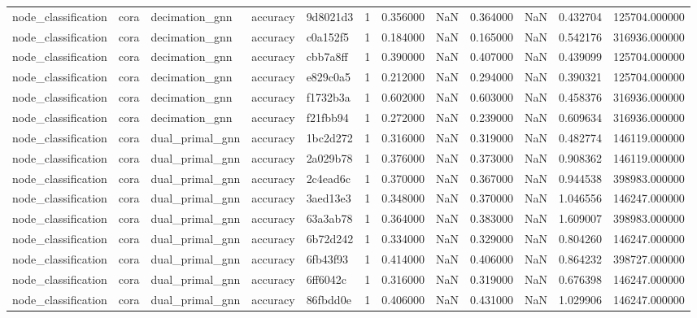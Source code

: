\begin{tabular}{lllllrrrrrrr}
node_classification & cora & decimation_gnn & accuracy & 9d8021d3 & 1 & 0.356000 & NaN & 0.364000 & NaN & 0.432704 & 125704.000000 \\
node_classification & cora & decimation_gnn & accuracy & c0a152f5 & 1 & 0.184000 & NaN & 0.165000 & NaN & 0.542176 & 316936.000000 \\
node_classification & cora & decimation_gnn & accuracy & cbb7a8ff & 1 & 0.390000 & NaN & 0.407000 & NaN & 0.439099 & 125704.000000 \\
node_classification & cora & decimation_gnn & accuracy & e829c0a5 & 1 & 0.212000 & NaN & 0.294000 & NaN & 0.390321 & 125704.000000 \\
node_classification & cora & decimation_gnn & accuracy & f1732b3a & 1 & 0.602000 & NaN & 0.603000 & NaN & 0.458376 & 316936.000000 \\
node_classification & cora & decimation_gnn & accuracy & f21fbb94 & 1 & 0.272000 & NaN & 0.239000 & NaN & 0.609634 & 316936.000000 \\
node_classification & cora & dual_primal_gnn & accuracy & 1bc2d272 & 1 & 0.316000 & NaN & 0.319000 & NaN & 0.482774 & 146119.000000 \\
node_classification & cora & dual_primal_gnn & accuracy & 2a029b78 & 1 & 0.376000 & NaN & 0.373000 & NaN & 0.908362 & 146119.000000 \\
node_classification & cora & dual_primal_gnn & accuracy & 2c4ead6c & 1 & 0.370000 & NaN & 0.367000 & NaN & 0.944538 & 398983.000000 \\
node_classification & cora & dual_primal_gnn & accuracy & 3aed13e3 & 1 & 0.348000 & NaN & 0.370000 & NaN & 1.046556 & 146247.000000 \\
node_classification & cora & dual_primal_gnn & accuracy & 63a3ab78 & 1 & 0.364000 & NaN & 0.383000 & NaN & 1.609007 & 398983.000000 \\
node_classification & cora & dual_primal_gnn & accuracy & 6b72d242 & 1 & 0.334000 & NaN & 0.329000 & NaN & 0.804260 & 146247.000000 \\
node_classification & cora & dual_primal_gnn & accuracy & 6fb43f93 & 1 & 0.414000 & NaN & 0.406000 & NaN & 0.864232 & 398727.000000 \\
node_classification & cora & dual_primal_gnn & accuracy & 6ff6042c & 1 & 0.316000 & NaN & 0.319000 & NaN & 0.676398 & 146247.000000 \\
node_classification & cora & dual_primal_gnn & accuracy & 86fbdd0e & 1 & 0.406000 & NaN & 0.431000 & NaN & 1.029906 & 146247.000000 \\

\end{tabular}
